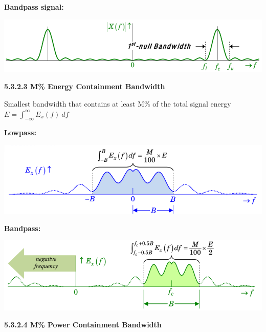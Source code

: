 \documentclass[landscape,a4paper]{extarticle}
\newenvironment{Figure}
  {\noindent\minipage{\linewidth}}
  {\endminipage\par\medskip}
\begin{document}
\begin{multicols*}{5}
    \textbf{Bandpass signal: }

    \begin{Figure}
        \centering
        \includegraphics[width=\linewidth]{1stNull_bandpass.png}
    \end{Figure}

    \textbf{5.3.2.3 M\% Energy Containment Bandwidth}

    Smallest bandwidth that contains at least M\% of the total signal energy $E = \int_{-\infty}^{\infty}E_x(f)\ df$

    \textbf{Lowpass:}

    \begin{Figure}
        \centering
        \includegraphics[width=\linewidth]{MPercentEnergy_lowpass.png}
    \end{Figure}

    \textbf{Bandpass:}

    \begin{Figure}
        \centering
        \includegraphics[width=\linewidth]{MPercentEnergy_bandpass.png}
    \end{Figure}

    \textbf{5.3.2.4 M\% Power Containment Bandwidth}


\end{multicols*}
\end{document}
